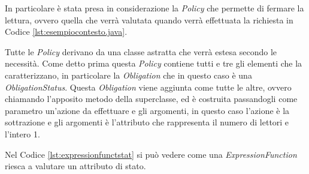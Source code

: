 In particolare è stata presa in considerazione la \textit{Policy} che permette di fermare la lettura, ovvero quella che verrà valutata quando verrà effettuata la richiesta in Codice \ref{lst:esempiocontesto.java}.\\ \par
Tutte le \textit{Policy} derivano da una classe astratta che verrà estesa secondo le necessità. Come detto prima questa \textit{Policy} contiene tutti e tre gli elementi che la caratterizzano, in particolare la \textit{Obligation} che in questo caso è una \textit{ObligationStatus}. Questa \textit{Obligation} viene aggiunta come tutte le altre, ovvero chiamando l'apposito metodo della superclasse, ed è costruita passandogli come parametro un'azione da effettuare e gli argomenti, in questo caso l'azione è la sottrazione e gli argomenti è l'attributo che rappresenta il numero di lettori e l'intero 1. \\ \par
{}
Nel Codice \ref{lst:expressionfunctstat} si può vedere come una \textit{ExpressionFunction} riesca a valutare un attributo di stato.


    


